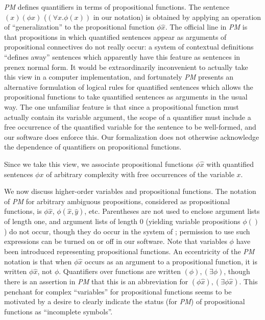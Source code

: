 \documentclass{article}
\begin{document}
{\em PM\/} defines quantifiers in terms of propositional functions.
The sentence $(x)(\phi x)$ ($(\forall x.\phi(x))$ in our
notation) is obtained by applying an operation of ``generalization''
to the propositional function $\phi \hat{x}$.  The official line in
{\em PM\/} is that propositions in which quantified sentences appear
as arguments of propositional connectives do not really occur: a
system of contextual definitions ``defines away'' sentences which
apparently have this feature as sentences in prenex normal form.  It
would be extraordinarily inconvenient to actually take this view in a
computer implementation, and fortunately {\em PM\/} presents an
alternative formulation of logical rules for quantified sentences
which allows the propositional functions to take quantified sentences
as arguments in the usual way.  The one unfamiliar feature is that
since a propositional function must actually contain its variable
argument, the scope of a quantifier must include a free occurrence of
the quantified variable for the sentence to be well-formed, and our
software does enforce this.  Our formalization does not otherwise
acknowledge the dependence of quantifiers on propositional functions.

Since we take this view, we associate propositional functions $\phi
\hat{x}$ with quantified sentences $\phi x$ of arbitrary complexity with free
occurrences of the variable $x$.

We now discuss higher-order variables and propositional functions.
The notation of {\em PM\/} for arbitrary ambiguous propositions,
considered as propositional functions, is $\phi \hat{x}$,
$\phi(\hat{x},\hat{y})$, etc.  Parentheses are not used to enclose
argument lists of length one, and argument lists of length 0 (yielding
variable propositions $\phi()$) do not occur, though they do occur in
the system of \cite{types40}; permission to use such expressions can
be turned on or off in our software.  Note that variables $\phi$ have
been introduced representing propositional functions.  An eccentricity
of the {\em PM\/} notation is that when $\phi \hat{x}$ occurs as an
argument to a propositional function, it is written $\phi \hat{x}$,
not $\phi$.  Quantifiers over functions are written $(\phi), (\exists
\phi)$, though there is an assertion in {\em PM\/} that this is an
abbreviation for $(\phi \hat{x}),(\exists\phi \hat{x})$.  This
penchant for complex ``variables'' for propositional functions seems
to be motivated by a desire to clearly indicate the status (for {\em
PM\/}) of propositional functions as ``incomplete symbols''.
\end{document}

